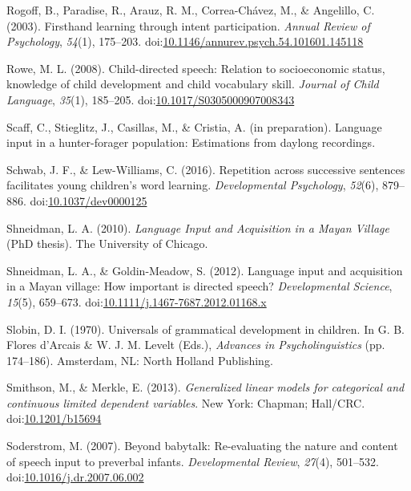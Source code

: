 \documentclass[floatsintext,man]{apa6}
\theoremstyle{definition}
\theoremstyle{definition}
\theoremstyle{definition}
\theoremstyle{remark}
\begin{document}
\hypertarget{ref-rogoff2003firsthand}{}
Rogoff, B., Paradise, R., Arauz, R. M., Correa-Chávez, M., \& Angelillo,
C. (2003). Firsthand learning through intent participation. \emph{Annual
Review of Psychology}, \emph{54}(1), 175--203.
doi:\href{https://doi.org/10.1146/annurev.psych.54.101601.145118}{10.1146/annurev.psych.54.101601.145118}

\hypertarget{ref-rowe2008child}{}
Rowe, M. L. (2008). Child-directed speech: Relation to socioeconomic
status, knowledge of child development and child vocabulary skill.
\emph{Journal of Child Language}, \emph{35}(1), 185--205.
doi:\href{https://doi.org/10.1017/S0305000907008343}{10.1017/S0305000907008343}

\hypertarget{ref-scaffIPlanguage}{}
Scaff, C., Stieglitz, J., Casillas, M., \& Cristia, A. (in preparation).
Language input in a hunter-forager population: Estimations from daylong
recordings.

\hypertarget{ref-schwab2016repetition}{}
Schwab, J. F., \& Lew-Williams, C. (2016). Repetition across successive
sentences facilitates young children's word learning.
\emph{Developmental Psychology}, \emph{52}(6), 879--886.
doi:\href{https://doi.org/10.1037/dev0000125}{10.1037/dev0000125}

\hypertarget{ref-shneidman2010language}{}
Shneidman, L. A. (2010). \emph{Language Input and Acquisition in a Mayan
Village} (PhD thesis). The University of Chicago.

\hypertarget{ref-shneidman2012language}{}
Shneidman, L. A., \& Goldin-Meadow, S. (2012). Language input and
acquisition in a Mayan village: How important is directed speech?
\emph{Developmental Science}, \emph{15}(5), 659--673.
doi:\href{https://doi.org/10.1111/j.1467-7687.2012.01168.x}{10.1111/j.1467-7687.2012.01168.x}

\hypertarget{ref-slobin1970universals}{}
Slobin, D. I. (1970). Universals of grammatical development in children.
In G. B. Flores d'Arcais \& W. J. M. Levelt (Eds.), \emph{Advances in
Psycholinguistics} (pp. 174--186). Amsterdam, NL: North Holland
Publishing.

\hypertarget{ref-smithson2013generalized}{}
Smithson, M., \& Merkle, E. (2013). \emph{Generalized linear models for
categorical and continuous limited dependent variables}. New York:
Chapman; Hall/CRC.
doi:\href{https://doi.org/10.1201/b15694}{10.1201/b15694}

\hypertarget{ref-soderstrom2007beyond}{}
Soderstrom, M. (2007). Beyond babytalk: Re-evaluating the nature and
content of speech input to preverbal infants. \emph{Developmental
Review}, \emph{27}(4), 501--532.
doi:\href{https://doi.org/10.1016/j.dr.2007.06.002}{10.1016/j.dr.2007.06.002}
\end{document}
